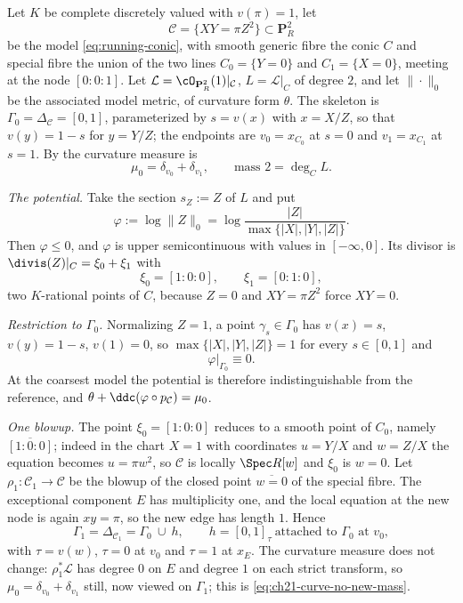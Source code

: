 \begin{example}
\label{ex:ch21-conic-refinement}
Let $K$ be complete discretely valued with $v(\pi)=1$, let
\[
 \mathcal C=\{XY=\pi Z^2\}\subset\mathbf P^2_R
\]
be the model \eqref{eq:running-conic}, with smooth generic fibre the conic
$C$ and special fibre the union of the two lines
$C_0=\{Y=0\}$ and $C_1=\{X=0\}$, meeting at the node
$[0:0:1]$.  Let $\mathcal L=\cO_{\mathbf P^2_R}(1)|_{\mathcal C}$,
$L=\mathcal L|_C$ of degree $2$, and let $\|\cdot\|_0$ be the
associated model metric, of curvature form $\theta$.  The skeleton is
$\Gamma_0=\Delta_{\mathcal C}=[0,1]$, parameterized by
$s=v(x)$ with $x=X/Z$, so that $v(y)=1-s$ for $y=Y/Z$; the
endpoints are $v_0=x_{C_0}$ at $s=0$ and $v_1=x_{C_1}$ at $s=1$.
By  the curvature measure is
\begin{equation}
\label{eq:ch21-conic-mu0}
 \mu_0=\delta_{v_0}+\delta_{v_1},
 \qquad
 \text{mass }2=\deg_CL .
\end{equation}

\emph{The potential.}  Take the section $s_Z:=Z$ of $L$ and put
\[
 \varphi:=\log\lVert Z\rVert_0
 =\log\frac{|Z|}{\max\{|X|,|Y|,|Z|\}} .
\]
Then $\varphi\leq0$, and $\varphi$ is upper semicontinuous with values
in $[-\infty,0]$.  Its divisor is
$\divis(Z)|_C=\xi_0+\xi_1$ with
\[
 \xi_0=[1:0:0],\qquad \xi_1=[0:1:0],
\]
two $K$-rational points of $C$, because $Z=0$ and $XY=\pi Z^2$ force
$XY=0$.

\emph{Restriction to $\Gamma_0$.}  Normalizing $Z=1$, a point
$\gamma_s\in\Gamma_0$ has $v(x)=s$, $v(y)=1-s$, $v(1)=0$, so
$\max\{|X|,|Y|,|Z|\}=1$ for every $s\in[0,1]$ and
\begin{equation}
\label{eq:ch21-conic-restriction-0}
 \varphi|_{\Gamma_0}\equiv0 .
\end{equation}
At the coarsest model the potential is therefore indistinguishable from the
reference, and $\theta+\ddc(\varphi\circ p_{\mathcal C})=\mu_0$.

\emph{One blowup.}  The point $\xi_0=[1:0:0]$ reduces to a smooth point
of $C_0$, namely $\overline{[1:0:0]}$; indeed in the chart $X=1$ with
coordinates $u=Y/X$ and $w=Z/X$ the equation becomes $u=\pi w^2$, so
$\mathcal C$ is locally $\Spec R[w]$ and $\xi_0$ is $w=0$.  Let
$\rho_1:\mathcal C_1\to\mathcal C$ be the blowup of the closed point
$\overline{w=0}$ of the special fibre.  The exceptional component $E$ has
multiplicity one, and the local equation at the new node is again
$xy=\pi$, so the new edge has length $1$.  Hence
\[
 \Gamma_1=\Delta_{\mathcal C_1}=\Gamma_0\ \cup\ h,
 \qquad h=[0,1]_\tau\ \text{attached to }\Gamma_0\text{ at }v_0,
\]
with $\tau=v(w)$, $\tau=0$ at $v_0$ and $\tau=1$ at $x_E$.  The
curvature measure does not change: $\rho_1^*\mathcal L$ has degree $0$
on $E$ and degree $1$ on each strict transform, so
$\mu_0=\delta_{v_0}+\delta_{v_1}$ still, now viewed on $\Gamma_1$; this
is \eqref{eq:ch21-curve-no-new-mass}.


\end{example}
